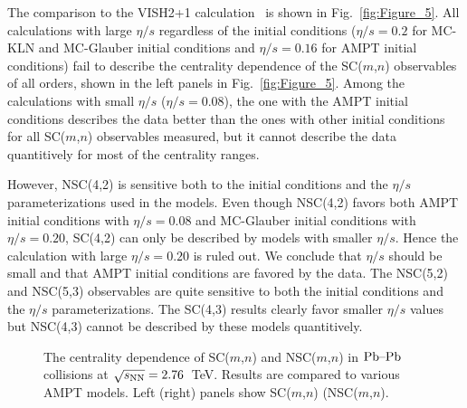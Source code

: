 The comparison to the VISH2+1 calculation~\cite{Zhu:2016puf} is shown in Fig.~\ref{fig:Figure_5}.  All calculations with large $\eta/s$ regardless of the initial conditions ($\eta/s=0.2$ for MC-KLN and MC-Glauber initial conditions and $\eta/s=0.16$ for AMPT initial conditions) fail to describe the centrality dependence of the SC($m$,$n$) observables of all orders, shown in the left panels in Fig.~\ref{fig:Figure_5}.
Among the calculations with small $\eta/s$ ($\eta/s=0.08$), the one with the AMPT initial conditions describes the data better than the ones with other initial conditions for all SC($m$,$n$) observables measured, but it cannot describe the data quantitively for most of the centrality ranges.

However, NSC(4,2) is sensitive both to the initial conditions and the $\eta/s$ parameterizations used in the models.
Even though NSC(4,2) favors both AMPT initial conditions with $\eta/s=0.08$ and MC-Glauber initial conditions with $\eta/s=0.20$,
SC(4,2) can only be described by models with smaller $\eta/s$. Hence the calculation with large $\eta/s=0.20$ is ruled out. We conclude that $\eta/s$ should be small and that AMPT initial conditions are favored by the data.
The NSC(5,2) and NSC(5,3) observables are quite sensitive to both the initial conditions and the $\eta/s$ parameterizations.
The SC(4,3) results clearly favor smaller $\eta/s$ values but NSC(4,3) cannot be described by these models quantitively.

 \begin{figure}[t!]
	\begin{center}
        \caption{The centrality dependence of SC($m$,$n$) and NSC($m$,$n$) in $\textnormal{Pb--Pb}$ collisions at $\sqrt{s_{\textnormal{NN}}}=2.76$~TeV. Results are compared to various AMPT models. Left (right) panels show SC($m$,$n$)  (NSC($m$,$n$).}
        \label{fig:Figure_6}
        \end{center}   
 \end{figure}
 
